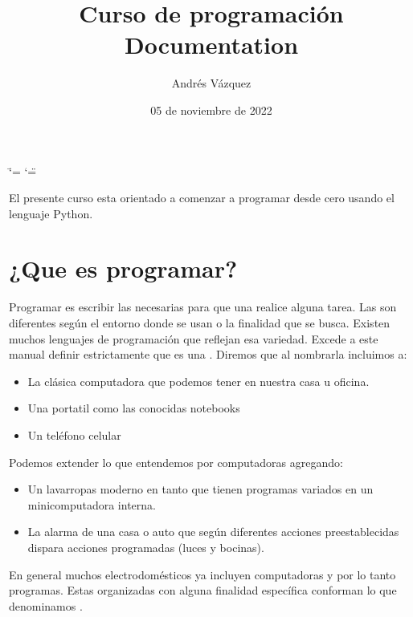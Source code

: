 \documentclass[a4paper,12pt,spanish]{sphinxmanual}
\title{Curso de programación Documentation}
\date{05 de noviembre de 2022}
\author{Andrés Vázquez}
\begin{document}
\ifdefined\shorthandoff
  \ifnum\catcode`\=\string=\active\shorthandoff{=}\fi
  \ifnum\catcode`\"=\active{}\fi
\fi

\pagestyle{empty}
\sphinxmaketitle
\pagestyle{plain}
\sphinxtableofcontents
\pagestyle{normal}
\label{\detokenize{index::doc}}


\sphinxAtStartPar
El presente curso esta orientado a comenzar a programar desde cero usando el lenguaje Python.

\sphinxstepscope


\chapter{¿Que es programar?}
\label{\detokenize{que:que-es-programar}}\label{\detokenize{que::doc}}
\sphinxAtStartPar
Programar es escribir las  necesarias para que una  realice alguna tarea.
Las  son diferentes según el entorno donde se usan o la finalidad que se busca.
Existen muchos lenguajes de programación que reflejan esa variedad.
Excede a este manual definir estrictamente que es una . Diremos que al nombrarla incluimos a:
\begin{itemize}
\item {} 
\sphinxAtStartPar
La clásica computadora que podemos tener en nuestra casa u oficina.

\item {} 
\sphinxAtStartPar
Una portatil como las conocidas notebooks

\item {} 
\sphinxAtStartPar
Un teléfono celular

\end{itemize}

\sphinxAtStartPar
Podemos extender lo que entendemos por computadoras agregando:
\begin{itemize}
\item {} 
\sphinxAtStartPar
Un lavarropas moderno en tanto que tienen programas variados en un mini\sphinxhyphen{}computadora interna.

\item {} 
\sphinxAtStartPar
La alarma de una casa o auto que según diferentes acciones pre\sphinxhyphen{}establecidas dispara acciones programadas (luces y bocinas).

\end{itemize}

\sphinxAtStartPar
En general muchos electrodomésticos ya incluyen computadoras y por lo tanto programas.
Estas  organizadas con alguna finalidad específica conforman lo que denominamos .
\end{document}
